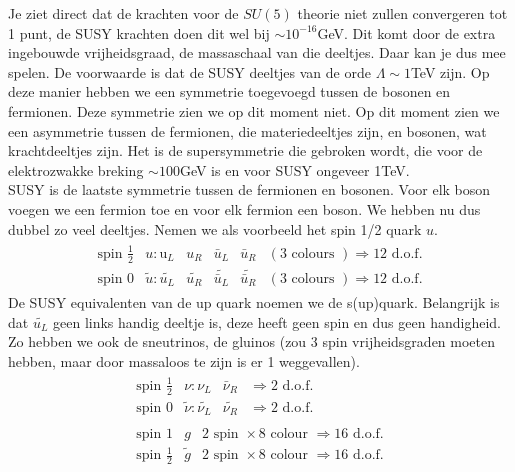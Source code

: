 \documentclass[../main.tex]{subfiles}
\begin{document}
Je ziet direct dat de krachten voor de $SU(5)$ theorie niet zullen convergeren tot 1 punt, de SUSY krachten doen dit wel bij $\sim 10^{-16}$GeV. Dit komt door de extra ingebouwde vrijheidsgraad, de massaschaal van die deeltjes. Daar kan je dus mee spelen. De voorwaarde is dat de SUSY deeltjes van de orde $\Lambda \sim 1$TeV zijn. Op deze manier hebben we een symmetrie toegevoegd tussen de bosonen en fermionen. Deze symmetrie zien we op dit moment niet. Op dit moment zien we een asymmetrie tussen de fermionen, die materiedeeltjes zijn, en bosonen, wat krachtdeeltjes zijn. Het is de supersymmetrie die gebroken wordt, die voor de elektrozwakke breking $\sim 100$GeV is en voor SUSY ongeveer 1TeV.\\
SUSY is de laatste symmetrie tussen de fermionen en bosonen. Voor elk boson voegen we een fermion toe en voor elk fermion een boson. We hebben nu dus dubbel zo veel deeltjes. Nemen we als voorbeeld het spin 1/2 quark $u$.
\begin{equation}
    \begin{aligned}
        \label{eq:susy_deeltjes_1}
        \begin{array}{llllll}
            \text{ spin } \frac{1}{2} & u: \text{u}_{L} & u_{R} & \bar{u}_{L} & \bar{u}_{R} & (3 \text { colours }) \Rightarrow 12 \text { d.o.f. } \\
            \text { spin } 0 & \tilde{u}: \widetilde{u_{L}} & \widetilde{u_{R}} & \widetilde{\bar{u}_{L}} & \widetilde{\bar{u}_{R}} & (3 \text { colours }) \Rightarrow 12 \text { d.o.f. }
        \end{array}
    \end{aligned}
\end{equation}
De SUSY equivalenten van de up quark noemen we de s(up)quark. Belangrijk is dat $\widetilde{u_{L}}$ geen links handig deeltje is, deze heeft geen spin en dus geen handigheid. Zo hebben we ook de sneutrinos, de gluinos (zou 3 spin vrijheidsgraden moeten hebben, maar door massaloos te zijn is er 1 weggevallen).
\begin{equation}
    \begin{aligned}
        \label{eq:susy_deeltjes_2}
        \begin{array}{llll}
            \text{ spin } \frac{1}{2} & \nu: \nu_{L} & \bar{\nu}_{R} & \Rightarrow 2 \text { d.o.f. } \\
            \text{ spin } 0 & \tilde{\nu}: \widetilde{\nu_{L}} & \widetilde{\nu_{R}} & \Rightarrow 2 \text { d.o.f. }
        \end{array}\\
        \begin{array}{lll}
            \text { spin } 1 & g & 2 \text{ spin } \times 8 \text { colour } \Rightarrow 16 \text { d.o.f. } \\
            \text{ spin } \frac{1}{2} & \tilde{g} & 2 \text{ spin } \times 8 \text { colour } \Rightarrow 16 \text { d.o.f. }
        \end{array}
    \end{aligned}
\end{equation}
\end{document}
